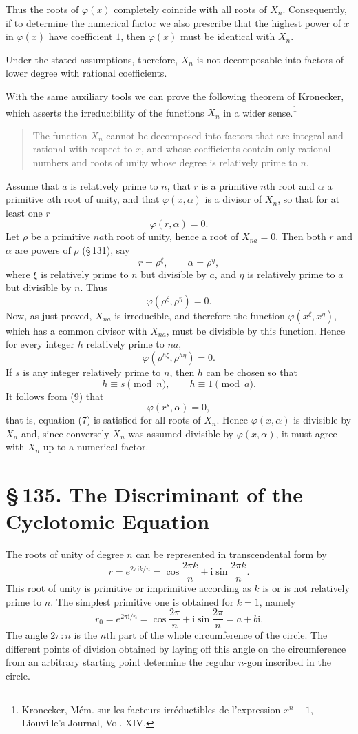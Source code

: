 \documentclass[11pt]{article}
\providecommand{\ii}{\mathrm{i}}
\providecommand{\sect}[2]{\section*{\S\,#1. #2}}
\begin{document}
Thus the roots of $\varphi(x)$ completely coincide with all roots of $X_n$. Consequently, if to determine the numerical factor we also prescribe that the highest power of $x$ in $\varphi(x)$ have coefficient $1$, then $\varphi(x)$ must be identical with $X_n$.

Under the stated assumptions, therefore, $X_n$ is not decomposable into factors of lower degree with rational coefficients.

With the same auxiliary tools we can prove the following theorem of Kronecker, which asserts the irreducibility of the functions $X_n$ in a wider sense.\footnote{Kronecker, Mém. sur les facteurs irréductibles de l'expression $x^n-1$, Liouville's Journal, Vol. XIV.}
\begin{quote}
The function $X_n$ cannot be decomposed into factors that are integral and rational with respect to $x$, and whose coefficients contain only rational numbers and roots of unity whose degree is relatively prime to $n$.
\end{quote}
Assume that $a$ is relatively prime to $n$, that $r$ is a primitive $n$th root and $\alpha$ a primitive $a$th root of unity, and that $\varphi(x,\alpha)$ is a divisor of $X_n$, so that for at least one $r$
\[
\tag{7}        \varphi(r,\alpha)=0.
\]
Let $\rho$ be a primitive $na$th root of unity, hence a root of $X_{na}=0$. Then both $r$ and $\alpha$ are powers of $\rho$ (\S\,131), say
\[
        r=\rho^\xi,
        \qquad
        \alpha=\rho^\eta,
\]
where $\xi$ is relatively prime to $n$ but divisible by $a$, and $\eta$ is relatively prime to $a$ but divisible by $n$. Thus
\[
\tag{8}        \varphi(\rho^\xi,\rho^\eta)=0.
\]
Now, as just proved, $X_{na}$ is irreducible, and therefore the function $\varphi(x^\xi,x^\eta)$, which has a common divisor with $X_{na}$, must be divisible by this function. Hence for every integer $h$ relatively prime to $na$,
\[
\tag{9}        \varphi(\rho^{h\xi},\rho^{h\eta})=0.
\]
If $s$ is any integer relatively prime to $n$, then $h$ can be chosen so that
\[
        h\equiv s\pmod n,
        \qquad
        h\equiv1\pmod a.
\]
It follows from (9) that
\[
        \varphi(r^s,\alpha)=0,
\]
that is, equation (7) is satisfied for all roots of $X_n$. Hence $\varphi(x,\alpha)$ is divisible by $X_n$ and, since conversely $X_n$ was assumed divisible by $\varphi(x,\alpha)$, it must agree with $X_n$ up to a numerical factor.

\sect{135}{The Discriminant of the Cyclotomic Equation}

The roots of unity of degree $n$ can be represented in transcendental form by
\[
\tag{1}        r=e^{2\pi \ii k/n}=\cos\frac{2\pi k}{n}+\ii\sin\frac{2\pi k}{n}.
\]
This root of unity is primitive or imprimitive according as $k$ is or is not relatively prime to $n$. The simplest primitive one is obtained for $k=1$, namely
\[
\tag{2}        r_0=e^{2\pi \ii/n}=\cos\frac{2\pi}{n}+\ii\sin\frac{2\pi}{n}=a+b\ii.
\]
The angle $2\pi:n$ is the $n$th part of the whole circumference of the circle. The different points of division obtained by laying off this angle on the circumference from an arbitrary starting point determine the regular $n$-gon inscribed in the circle.
\end{document}

